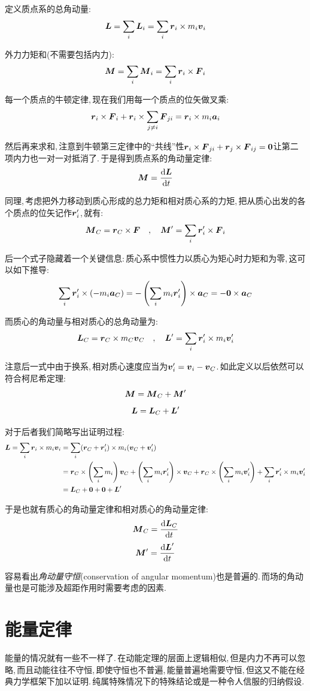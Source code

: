 定义质点系的总角动量:
\[\boldsymbol{L}=\sum_i\boldsymbol{L}_i=\sum_i\boldsymbol{r}_i\times m_i\boldsymbol{v}_i\]

外力力矩和(不需要包括内力):
\[\boldsymbol{M}=\sum_i\boldsymbol{M}_i=\sum_i \boldsymbol{r}_i\times\boldsymbol{F}_i\]

每一个质点的牛顿定律,\,现在我们用每一个质点的位矢做叉乘:
\[\boldsymbol{r}_i\times\boldsymbol{F}_i+\boldsymbol{r}_i\times\sum_{j\neq i}\boldsymbol{F}_{ji}=\boldsymbol{r}_i\times m_i\boldsymbol{a}_i\]

然后再来求和,\,注意到牛顿第三定律中的``共线''性$\boldsymbol{r}_i\times \boldsymbol{F}_{ji}+\boldsymbol{r}_j\times \boldsymbol{F}_{ij}=\boldsymbol{0}$让第二项内力也一对一对抵消了.\,于是得到质点系的角动量定律:
\[\boldsymbol{M}=\frac{\textrm{d} \boldsymbol{L}}{\textrm{d} t}\]

\vspace{0.5cm}

同理,\,考虑把外力移动到质心形成的总力矩和相对质心系的力矩,\,把从质心出发的各个质点的位矢记作$\boldsymbol{r}_i'$,\,就有:
\[\boldsymbol{M}_C=\boldsymbol{r}_C\times \boldsymbol{F}\quad,\quad \boldsymbol{M}'=\sum_i \boldsymbol{r}_i'\times \boldsymbol{F}_i\]

后一个式子隐藏着一个关键信息:\,质心系中惯性力以质心为矩心时力矩和为零,\,这可以如下推导:
\[\sum_i \boldsymbol{r}_i'\times (-m_i \boldsymbol{a}_C)=-\left(\sum_i m_i \boldsymbol{r}_i'\right)\times \boldsymbol{a}_C=-\boldsymbol{0}\times \boldsymbol{a}_C\]

而质心的角动量与相对质心的总角动量为:
\[\boldsymbol{L}_C=\boldsymbol{r}_C\times m_C\boldsymbol{v}_C\quad,\quad \boldsymbol{L}'=\sum_i \boldsymbol{r}_i'\times m_i\boldsymbol{v}_i'\]

注意后一式中由于换系,\,相对质心速度应当为$\boldsymbol{v}_i'=\boldsymbol{v}_i-\boldsymbol{v}_C$.\,如此定义以后依然可以符合柯尼希定理:
\[\boldsymbol{M}=\boldsymbol{M}_C+\boldsymbol{M}'\]
\[\boldsymbol{L}=\boldsymbol{L}_C+\boldsymbol{L}'\]

对于后者我们简略写出证明过程:
\begin{align*}
	\boldsymbol{L}=\sum_i\boldsymbol{r}_i\times m_i\boldsymbol{v}_i &=\sum_i(\boldsymbol{r}_C+\boldsymbol{r}_i')\times m_i(\boldsymbol{v}_C+\boldsymbol{v}_i')\\
													   			   &=\boldsymbol{r}_C\times\left(\sum_i m_i\right)\boldsymbol{v}_C+\left(\sum_i m_i\boldsymbol{r}_i'\right)\times\boldsymbol{v}_C+\boldsymbol{r}_C\times\left(\sum_i m_i\boldsymbol{v}_i'\right)+\sum_i \boldsymbol{r}_i'\times m_i\boldsymbol{v}_i'\\
													   			   &=\boldsymbol{L}_C+\boldsymbol{0}+\boldsymbol{0}+\boldsymbol{L}'
\end{align*}

于是也就有质心的角动量定律和相对质心的角动量定律:
\[\boldsymbol{M}_C=\frac{\textrm{d} \boldsymbol{L}_C}{\textrm{d} t}\]
\[\boldsymbol{M}'=\frac{\textrm{d} \boldsymbol{L}'}{\textrm{d} t}\]

容易看出\emph{角动量守恒}(conservation of angular momentum)也是普遍的.\,而场的角动量也是可能涉及超距作用时需要考虑的因素.

\section{能量定律}
能量的情况就有一些不一样了.\,在动能定理的层面上逻辑相似,\,但是内力不再可以忽略,\,而且动能往往不守恒,\,即使守恒也不普遍,\,能量普遍地需要守恒,\,但这又不能在经典力学框架下加以证明.\,纯属特殊情况下的特殊结论或是一种令人信服的归纳假设.

